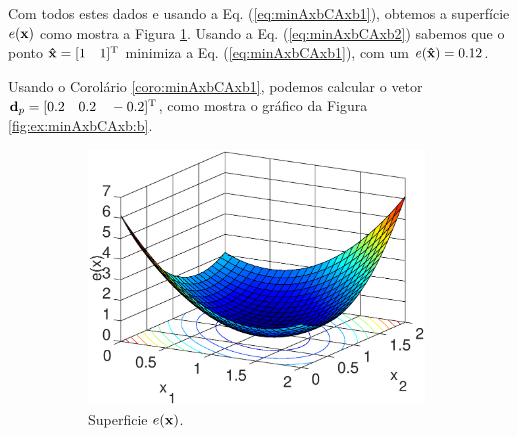 \begin{SolutionT}
\label{ex:minAxbCAxb:sol1}
Com todos estes dados e usando a Eq. (\ref{eq:minAxbCAxb1}),
obtemos a superfície $e(\VECTOR{x})$ como mostra a Figura \ref{fig:ex:minAxbCAxb:a}.
Usando a Eq. (\ref{eq:minAxbCAxb2}) sabemos que o ponto $\VECTOR{\hat{x}}=[1\quad 1]^{\transpose}$
minimiza a Eq. (\ref{eq:minAxbCAxb1}), com um $e(\VECTOR{\hat{x}})=0.12$.

Usando o Corolário \ref{coro:minAxbCAxb1}, podemos calcular o vetor $\VECTOR{d}_p=[0.2 \quad 0.2 \quad -0.2]^{\transpose}$,
como mostra o gráfico da Figura \ref{fig:ex:minAxbCAxb:b}.

\begin{figure}[h!]
     \centering
     \begin{subfigure}[b]{0.66\textwidth}
         \centering
         \includegraphics[width=0.98\textwidth]{chapters/minimization-fx/mfiles/ax1/surfcex.eps}
         \caption{Superficie $e(\VECTOR{x})$. }
         \label{fig:ex:minAxbCAxb:a}
     \end{subfigure}
     \hfill
     \begin{subfigure}[b]{0.32\textwidth}
         \centering

\end{subfigure}
\end{figure}
\end{SolutionT}
